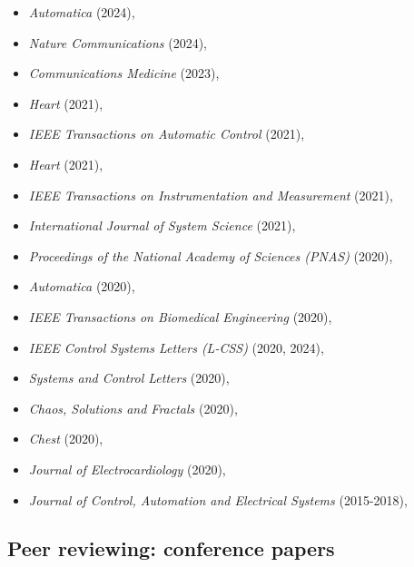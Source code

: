 \documentclass[10pt,A4]{article} %
\begin{document}
\begin{itemize}
 \item {\em Automatica } (2024),  \item {\em Nature Communications } (2024),  \item {\em Communications Medicine } (2023),  \item {\em Heart } (2021),  \item {\em IEEE Transactions on Automatic Control } (2021),  \item {\em Heart } (2021),  \item {\em IEEE Transactions on Instrumentation and Measurement } (2021),  \item {\em International Journal of System Science } (2021),  \item {\em Proceedings of the National Academy of Sciences (PNAS) } (2020),  \item {\em Automatica } (2020),  \item {\em IEEE Transactions on Biomedical Engineering } (2020),  \item {\em IEEE Control Systems Letters (L-CSS) } (2020, 2024),  \item {\em Systems and Control Letters } (2020),  \item {\em Chaos, Solutions and Fractals } (2020),  \item {\em Chest } (2020),  \item {\em Journal of Electrocardiology } (2020),  \item {\em Journal of Control, Automation and Electrical Systems } (2015-2018), 
\end{itemize}

\subsection{Peer reviewing: conference papers}
\end{document}
